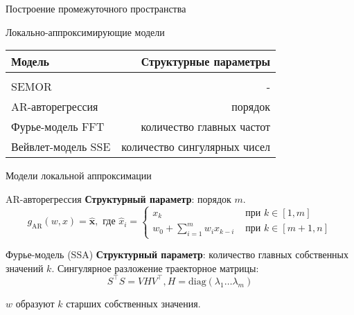 \documentclass{beamer}
\newcommand{\bx}{\mathbf{x}}
\newcommand{\R}{\mathbb{R}}
\begin{document}


\begin{frame}{Построение промежуточного пространства}
    \begin{block}{Локально-аппроксимирующие модели}
    \begin{center}
        \begin{tabular}{| l | r |}
            Модель & Структурные параметры \\
            \hline \\
            SEMOR & - \\
            AR-авторегрессия & порядок \\
            Фурье-модель FFT & количество главных частот \\
            Вейвлет-модель SSE & количество сингулярных чисел\\
            \hline
            \end{tabular}
    \end{center}
    \end{block}
\end{frame}


\begin{frame}{Модели локальной аппроксимации}
    \begin{block}{AR-авторегрессия}
        \textbf{Структурный параметр}: порядок $m$.
        $$
        g_{\text{AR}}(w, x) = \hat{\bx}, \text{ где }
        \hat{x}_i = \begin{cases}
            x_k & \text{ при } k \in [1, m] \\
            w_0 + \sum_{i=1}^m w_i x_{k - i} & \text{ при } k \in [m + 1, n]
        \end{cases}
        $$
    \end{block}


\begin{block}{Фурье-модель (SSA)}
    \textbf{Структурный параметр}: количество главных собственных значений $k$.
    Сингулярное разложение траекторное матрицы:
    $$
    S^\intercal S = VHV^\intercal, H = \mathrm{diag}(\lambda_1 \ldots \lambda_m)
    $$

    $w$ образуют $k$ старших собственных значения.
\end{block}
\end{frame}
\end{document}
